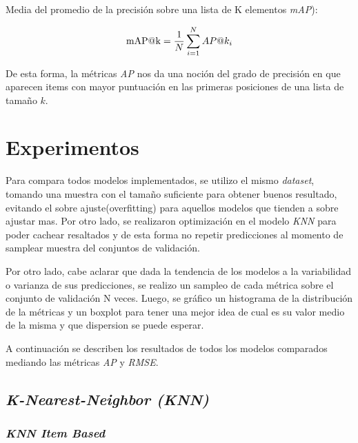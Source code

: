 \documentclass[11pt,a4paper,twoside]{thesis}
\begin{document}
{\begin{description}
	\item[Media del promedio de la precisión sobre una lista de K elementos \textit{mAP\makeatletter@k}):]
\end{description}
\begin{equation}
	\operatorname{mAP\makeatletter@k}=\frac{1}{N} \sum_{i=1}^N AP\makeatletter@k_i
\end{equation}

De esta forma, la métricas \textit{AP\makeatletter@k} nos da una noción del grado de precisión en que aparecen items con mayor puntuación en las primeras posiciones de una lista de tamaño $k$.


\chapter{Experimentos}

Para compara todos modelos implementados, se utilizo el mismo \textit{dataset}, tomando una muestra con el tamaño suficiente para obtener buenos resultado, evitando el sobre ajuste(overfitting) para aquellos modelos que tienden a sobre ajustar mas. Por otro lado, se realizaron optimización en el modelo \textit{KNN} para poder cachear resaltados y de esta forma no repetir predicciones al momento de samplear muestra del conjuntos de validación.

Por otro lado, cabe aclarar que dada la tendencia de los modelos a la variabilidad o varianza de sus predicciones, se realizo un sampleo de cada métrica sobre el conjunto de validación N veces. Luego, se gráfico un histograma de la distribución de la métricas y un boxplot para tener una mejor idea de cual es su valor medio de la misma y que dispersion se puede esperar.


A continuación se describen los resultados de todos los modelos comparados mediando las métricas \textit{AP\makeatletter@k} y \textit{RMSE}.

\section{\textit{K-Nearest-Neighbor (KNN)}}

\subsection{\textit{KNN Item Based}}

}
\end{document}
